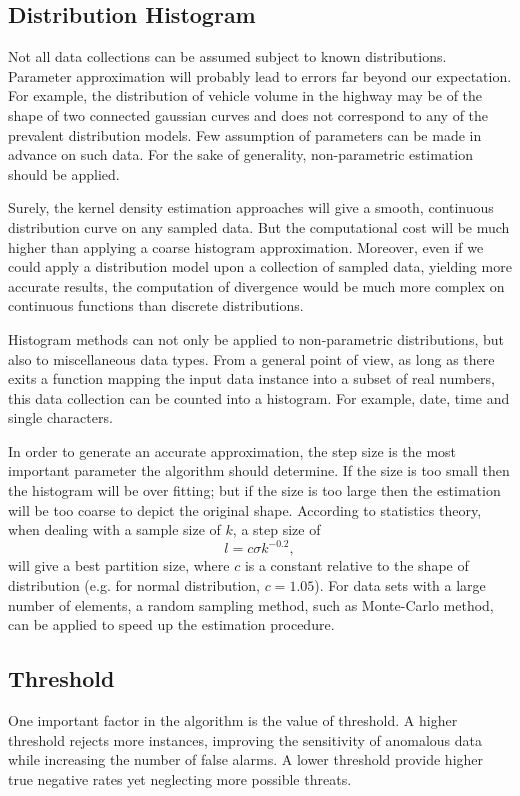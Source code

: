 \documentclass[10pt,conference,letterpaper]{IEEEtran}
\begin{document}
		\subsection{Distribution Histogram}\label{sec:alg-histogram}
			Not all data collections can be assumed subject to known distributions. Parameter approximation will probably lead to errors far beyond our expectation. For example, the distribution of vehicle volume in the highway may be of the shape of two connected gaussian curves and does not correspond to any of the prevalent distribution models. Few assumption of parameters can be made in advance on such data. For the sake of generality, non-parametric estimation should be applied.
			
			Surely, the kernel density estimation approaches will give a smooth, continuous distribution curve on any sampled data. But the computational cost will be much higher than applying a coarse histogram approximation.
			Moreover, even if we could apply a distribution model upon a collection of sampled data, yielding more accurate results, the computation of divergence would be much more complex on continuous functions than discrete distributions.
			
			Histogram methods can not only be applied to non-parametric distributions, but also to miscellaneous data types. From a general point of view, as long as there exits a function mapping the input data instance into a subset of real numbers, this data collection can be counted into a histogram. For example, date, time and single characters.
	
			In order to generate an accurate approximation, the step size is the most important parameter the algorithm should determine. If the size is too small then the histogram will be over fitting; but if the size is too large then the estimation will be too coarse to depict the original shape. According to statistics theory, when dealing with a sample size of $k$, a step size of 
			\begin{equation}\label{equ:step-size}
				l = c \sigma k^{-0.2},
			\end{equation}
			will give a best partition size, where $c$ is a constant relative to the shape of distribution (e.g. for normal distribution, $c=1.05$). For data sets with a large number of elements, a random sampling method, such as Monte-Carlo method, can be applied to speed up the estimation procedure.
	
		\subsection{Threshold}\label{sec:alg-threshold}
			One important factor in the algorithm is the value of threshold. A higher threshold rejects more instances, improving the sensitivity of anomalous data while increasing the number of false alarms. A lower threshold provide higher true negative rates yet neglecting more possible threats.
			
\end{document}
